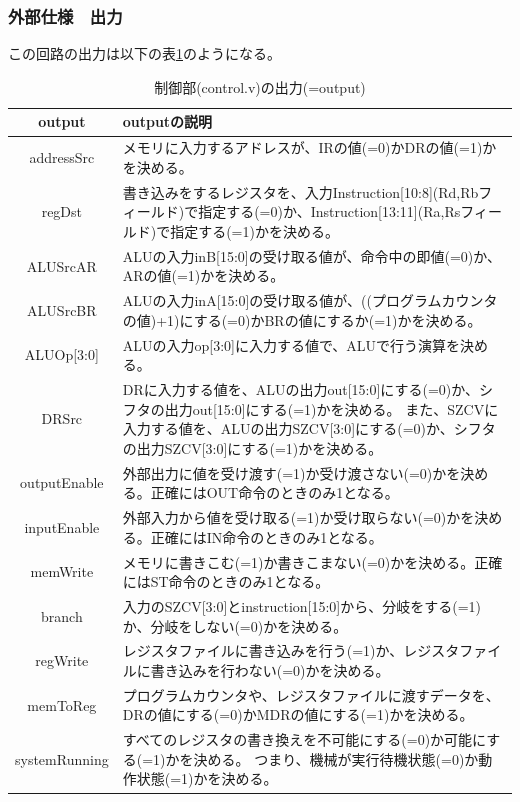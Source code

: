 \documentclass[a4j,titlepage]{jarticle}
\begin{document}
\subsubsection{外部仕様　出力}
この回路の出力は以下の表\ref{controlO}のようになる。
\begin{table}[H]
    \caption{制御部(control.v)の出力(=output)}
    \label{controlO}
    \begin{center}
    \begin {tabularx}{150mm}{|c|X|} \hline
         output & outputの説明 \\ \hline \hline
         addressSrc & メモリに入力するアドレスが、IRの値(=0)かDRの値(=1)かを決める。\\ \hline
         regDst & 書き込みをするレジスタを、入力Instruction[10:8](Rd,Rbフィールド)で指定する(=0)か、Instruction[13:11](Ra,Rsフィールド)で指定する(=1)かを決める。\\ \hline %
         ALUSrcAR & ALUの入力inB[15:0]の受け取る値が、命令中の即値(=0)か、ARの値(=1)かを決める。\\ \hline
         ALUSrcBR & ALUの入力inA[15:0]の受け取る値が、((プログラムカウンタの値)+1)にする(=0)かBRの値にするか(=1)かを決める。\\ \hline
         ALUOp[3:0] & ALUの入力op[3:0]に入力する値で、ALUで行う演算を決める。\\ \hline
         DRSrc & DRに入力する値を、ALUの出力out[15:0]にする(=0)か、シフタの出力out[15:0]にする(=1)かを決める。
         また、SZCVに入力する値を、ALUの出力SZCV[3:0]にする(=0)か、シフタの出力SZCV[3:0]にする(=1)かを決める。\\ \hline
         outputEnable & 外部出力に値を受け渡す(=1)か受け渡さない(=0)かを決める。正確にはOUT命令のときのみ1となる。\\ \hline
         inputEnable & 外部入力から値を受け取る(=1)か受け取らない(=0)かを決める。正確にはIN命令のときのみ1となる。\\ \hline
         memWrite & メモリに書きこむ(=1)か書きこまない(=0)かを決める。正確にはST命令のときのみ1となる。\\ \hline
         branch & 入力のSZCV[3:0]とinstruction[15:0]から、分岐をする(=1)か、分岐をしない(=0)かを決める。\\ \hline
         regWrite & レジスタファイルに書き込みを行う(=1)か、レジスタファイルに書き込みを行わない(=0)かを決める。\\ \hline
         memToReg & プログラムカウンタや、レジスタファイルに渡すデータを、DRの値にする(=0)かMDRの値にする(=1)かを決める。\\ \hline
         systemRunning & すべてのレジスタの書き換えを不可能にする(=0)か可能にする(=1)かを決める。
         つまり、機械が実行待機状態(=0)か動作状態(=1)かを決める。\\ \hline
    \end {tabularx}
    \end{center}
\end{table}
\end{document}
